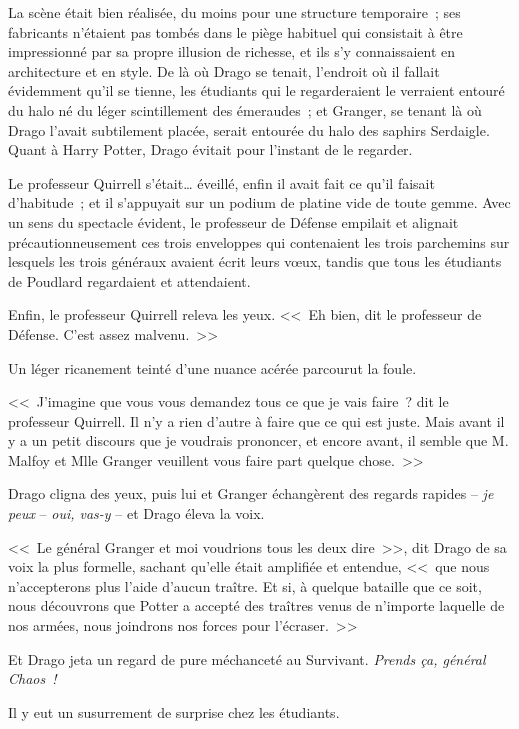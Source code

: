 \later

La scène était bien réalisée, du moins pour une structure temporaire~; ses fabricants n'étaient pas tombés dans le piège habituel qui consistait à être impressionné par sa propre illusion de richesse, et ils s'y connaissaient en architecture et en style. De là où Drago se tenait, l'endroit où il fallait évidemment qu'il se tienne, les étudiants qui le regarderaient le verraient entouré du halo né du léger scintillement des émeraudes~; et Granger, se tenant là où Drago l'avait subtilement placée, serait entourée du halo des saphirs Serdaigle. Quant à Harry Potter, Drago évitait pour l'instant de le regarder.

Le professeur Quirrell s'était… éveillé, enfin il avait fait ce qu'il faisait d'habitude~; et il s'appuyait sur un podium de platine vide de toute gemme. Avec un sens du spectacle évident, le professeur de Défense empilait et alignait précautionneusement ces trois enveloppes qui contenaient les trois parchemins sur lesquels les trois généraux avaient écrit leurs vœux, tandis que tous les étudiants de Poudlard regardaient et attendaient.

Enfin, le professeur Quirrell releva les yeux. <<~Eh bien, dit le professeur de Défense. C'est assez malvenu.~>>

Un léger ricanement teinté d'une nuance acérée parcourut la foule.

<<~J'imagine que vous vous demandez tous ce que je vais faire~? dit le professeur Quirrell. Il n'y a rien d'autre à faire que ce qui est juste. Mais avant il y a un petit discours que je voudrais prononcer, et encore avant, il semble que M. Malfoy et Mlle Granger veuillent vous faire part quelque chose.~>>

Drago cligna des yeux, puis lui et Granger échangèrent des regards rapides -- \emph{je peux} -- \emph{oui, vas-y} -- et Drago éleva la voix.

<<~Le général Granger et moi voudrions tous les deux dire~>>, dit Drago de sa voix la plus formelle, sachant qu'elle était amplifiée et entendue, <<~que nous n'accepterons plus l'aide d'aucun traître. Et si, à quelque bataille que ce soit, nous découvrons que Potter a accepté des traîtres venus de n'importe laquelle de nos armées, nous joindrons nos forces pour l'écraser.~>>

Et Drago jeta un regard de pure méchanceté au Survivant. \emph{Prends ça, général Chaos~!}

Il y eut un susurrement de surprise chez les étudiants.

